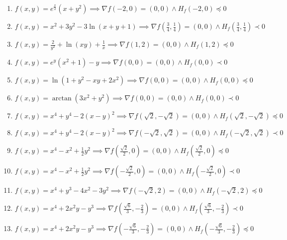 \documentclass[11pt,a4paper]{article}
\begin{document}
\begin{enumerate}
\item $\displaystyle f(x, y) = e^{\frac{x}{2}} (x + y^{2}) \implies \nabla f(-2, 0) = (0, 0) \land H_{f}(-2, 0) \preceq 0$
\item $\displaystyle f(x, y) = x^{2} + 3y^{2} - 3\ln(x + y + 1) \implies \nabla f\left( \frac{3}{4}, \frac{1}{4} \right) = (0, 0) \land H_{f}\left( \frac{3}{4}, \frac{1}{4} \right) \prec 0$
\item $\displaystyle f(x, y) = \frac{2}{y^{2}} + \ln(xy) + \frac{1}{x} \implies \nabla f(1, 2) = (0, 0) \land H_{f}(1, 2) \preceq 0$
\item $\displaystyle f(x, y) = e^{y} (x^{2} + 1) - y \implies \nabla f(0, 0) = (0, 0) \land H_{f}(0, 0) \prec 0$
\item $\displaystyle f(x, y) = \ln(1 + y^{2} - xy + 2x^{2}) \implies \nabla f(0, 0) = (0, 0) \land H_{f}(0, 0) \preceq 0$
\item $\displaystyle f(x, y) = \arctan(3x^{2} + y^{2}) \implies \nabla f(0, 0) = (0, 0) \land H_{f}(0, 0) \prec 0$
\item $\displaystyle f(x, y) = x^{4} + y^{4} - 2(x - y)^{2} \implies \nabla f\left( \sqrt{2}, -\sqrt{2} \right) = (0, 0) \land H_{f}\left( \sqrt{2}, -\sqrt{2} \right) \preceq 0$
\item $\displaystyle f(x, y) = x^{4} + y^{4} - 2(x - y)^{2} \implies \nabla f\left( -\sqrt{2}, \sqrt{2} \right) = (0, 0) \land H_{f}\left( -\sqrt{2}, \sqrt{2} \right) \prec 0$
\item $\displaystyle f(x, y) = x^{4} - x^{2} + \frac{1}{2} y^{2} \implies \nabla f\left( \frac{\sqrt{2}}{2}, 0 \right) = (0, 0) \land H_{f}\left( \frac{\sqrt{2}}{2}, 0 \right) \preceq 0$
\item $\displaystyle f(x, y) = x^{4} - x^{2} + \frac{1}{2} y^{2} \implies \nabla f\left( -\frac{\sqrt{2}}{2}, 0 \right) = (0, 0) \land H_{f}\left( -\frac{\sqrt{2}}{2}, 0 \right) \prec 0$
\item $\displaystyle f(x, y) = x^{4} + y^{3} - 4x^{2} - 3y^{2} \implies \nabla f\left( -\sqrt{2}, 2 \right) = (0, 0) \land H_{f}\left( -\sqrt{2}, 2 \right) \preceq 0$
\item $\displaystyle f(x, y) = x^{4} + 2x^{2} y - y^{3} \implies \nabla f\left( \frac{\sqrt{6}}{3}, -\frac{2}{3} \right) = (0, 0) \land H_{f}\left( \frac{\sqrt{6}}{3}, -\frac{2}{3} \right) \prec 0$
\item $\displaystyle f(x, y) = x^{4} + 2x^{2} y - y^{3} \implies \nabla f\left( -\frac{\sqrt{6}}{3}, -\frac{2}{3} \right) = (0, 0) \land H_{f}\left( -\frac{\sqrt{6}}{3}, -\frac{2}{3} \right) \preceq 0$

\end{enumerate}
\end{document}
